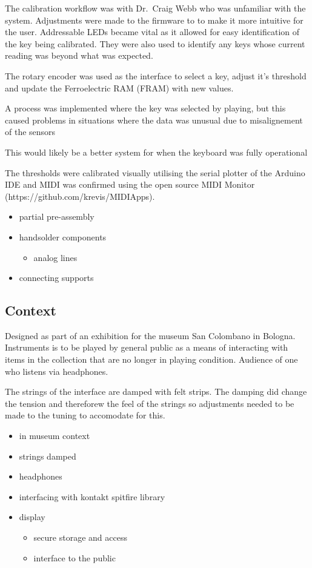 The calibration workflow was with Dr.~Craig Webb who was unfamiliar with
the system. Adjustments were made to the firmware to to make it more
intuitive for the user. Addressable LEDs became vital as it allowed for
easy identification of the key being calibrated. They were also used to
identify any keys whose current reading was beyond what was expected.

The rotary encoder was used as the interface to select a key, adjust
it's threshold and update the Ferroelectric RAM (FRAM) with new values.

A process was implemented where the key was selected by playing, but
this caused problems in situations where the data was unusual due to
misalignement of the sensors

This would likely be a better system for when the keyboard was fully
operational

The thresholds were calibrated visually utilising the serial plotter of
the Arduino IDE and MIDI was confirmed using the open source MIDI
Monitor (https://github.com/krevis/MIDIApps).

\begin{itemize}
\tightlist
\item
  partial pre-assembly
\item
  handsolder components

  \begin{itemize}
  \tightlist
  \item
    analog lines
  \end{itemize}
\item
  connecting supports
\end{itemize}

\subsection{Context}\label{context}

Designed as part of an exhibition for the museum San Colombano in
Bologna. Instruments is to be played by general public as a means of
interacting with items in the collection that are no longer in playing
condition. Audience of one who listens via headphones.

The strings of the interface are damped with felt strips. The damping
did change the tension and thereforew the feel of the strings so
adjustments needed to be made to the tuning to accomodate for this.

\begin{itemize}
\tightlist
\item
  in museum context
\item
  strings damped
\item
  headphones
\item
  interfacing with kontakt spitfire library
\item
  display

  \begin{itemize}
  \tightlist
  \item
    secure storage and access
  \item
    interface to the public
  \end{itemize}
\end{itemize}

